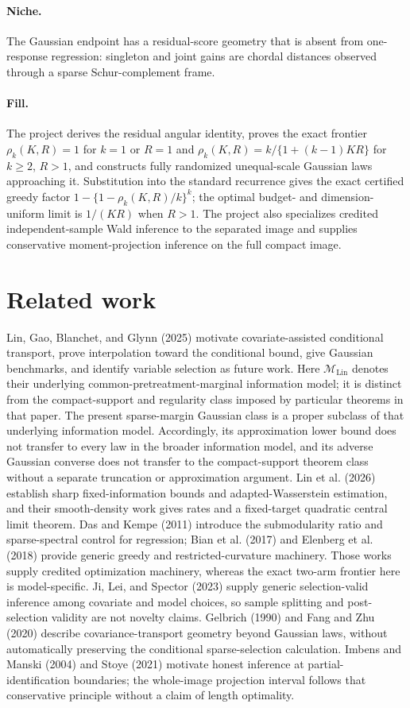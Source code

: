 \documentclass{article}
\begin{document}
\paragraph{Niche.} The Gaussian endpoint has a residual-score geometry that is absent from one-response regression: singleton and joint gains are chordal distances observed through a sparse Schur-complement frame.

\paragraph{Fill.} The project derives the residual angular identity, proves the exact frontier \(\rho_k(K,R)=1\) for \(k=1\) or \(R=1\) and \(\rho_k(K,R)=k/\{1+(k-1)KR\}\) for \(k\ge2\), \(R>1\), and constructs fully randomized unequal-scale Gaussian laws approaching it. Substitution into the standard recurrence gives the exact certified greedy factor \(1-\{1-\rho_k(K,R)/k\}^k\); the optimal budget- and dimension-uniform limit is \(1/(KR)\) when \(R>1\). The project also specializes credited independent-sample Wald inference to the separated image and supplies conservative moment-projection inference on the full compact image.

\section{Related work}

Lin, Gao, Blanchet, and Glynn (2025) motivate covariate-assisted conditional transport, prove interpolation toward the conditional bound, give Gaussian benchmarks, and identify variable selection as future work. Here \(\mathcal M_{\mathrm{Lin}}\) denotes their underlying common-pretreatment-marginal information model; it is distinct from the compact-support and regularity class imposed by particular theorems in that paper. The present sparse-margin Gaussian class is a proper subclass of that underlying information model. Accordingly, its approximation lower bound does not transfer to every law in the broader information model, and its adverse Gaussian converse does not transfer to the compact-support theorem class without a separate truncation or approximation argument. Lin et al. (2026) establish sharp fixed-information bounds and adapted-Wasserstein estimation, and their smooth-density work gives rates and a fixed-target quadratic central limit theorem. Das and Kempe (2011) introduce the submodularity ratio and sparse-spectral control for regression; Bian et al. (2017) and Elenberg et al. (2018) provide generic greedy and restricted-curvature machinery. Those works supply credited optimization machinery, whereas the exact two-arm frontier here is model-specific. Ji, Lei, and Spector (2023) supply generic selection-valid inference among covariate and model choices, so sample splitting and post-selection validity are not novelty claims. Gelbrich (1990) and Fang and Zhu (2020) describe covariance-transport geometry beyond Gaussian laws, without automatically preserving the conditional sparse-selection calculation. Imbens and Manski (2004) and Stoye (2021) motivate honest inference at partial-identification boundaries; the whole-image projection interval follows that conservative principle without a claim of length optimality.
\end{document}
